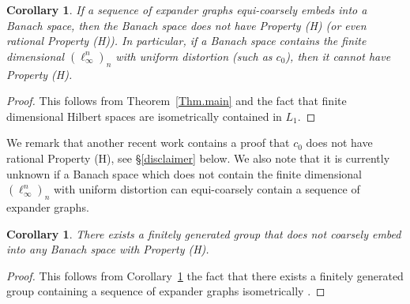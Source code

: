 \documentclass[11pt]{amsart}
\newtheorem{corollary}[theorem]{Corollary}
\theoremstyle{definition}
\theoremstyle{remark}
\begin{document}
\begin{corollary}\label{Cor.Prop.H}
If a sequence of expander graphs equi-coarsely embeds into a Banach space, then the Banach space does not have Property (H) (or even rational Property (H)). In particular, if a Banach space contains the finite dimensional $(\ell_\infty^n)_n$ with uniform distortion (such as $c_0$), then it cannot have Property (H).
\end{corollary}

\begin{proof}
This follows from Theorem~\ref{Thm.main} and the fact that finite dimensional Hilbert spaces are isometrically contained in $L_1$.
\end{proof}

We remark that another recent work \cite{ChengChengWang} contains a proof that $c_0$ does not have rational Property (H), see \S\ref{disclaimer} below. We also note that it is currently unknown if a Banach space which does not contain the finite dimensional $(\ell_\infty^n)_n$ with uniform distortion can equi-coarsely contain a sequence of expander graphs.

\begin{corollary}\label{Cor.Group}
There exists a finitely generated group that does not coarsely embed into any Banach space with Property (H).
\end{corollary}

\begin{proof}
This follows from Corollary~\ref{Cor.Prop.H} the fact that there exists a finitely generated group containing a sequence of expander graphs isometrically \cite{Osajda2020Acta}.
\end{proof}



\end{document}
